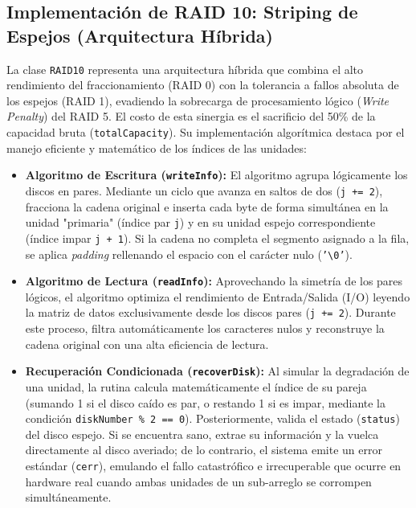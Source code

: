 \documentclass[12pt, a4paper]{article}
\begin{document}
\subsection{Implementación de RAID 10: Striping de Espejos (Arquitectura Híbrida)}

La clase \texttt{RAID10} representa una arquitectura híbrida que combina el alto rendimiento del fraccionamiento (RAID 0) con la tolerancia a fallos absoluta de los espejos (RAID 1), evadiendo la sobrecarga de procesamiento lógico (\textit{Write Penalty}) del RAID 5. El costo de esta sinergia es el sacrificio del 50\% de la capacidad bruta (\texttt{totalCapacity}). Su implementación algorítmica destaca por el manejo eficiente y matemático de los índices de las unidades:

\begin{itemize}
    \item \textbf{Algoritmo de Escritura (\texttt{writeInfo}):} El algoritmo agrupa lógicamente los discos en pares. Mediante un ciclo que avanza en saltos de dos (\texttt{j += 2}), fracciona la cadena original e inserta cada byte de forma simultánea en la unidad "primaria" (índice par \texttt{j}) y en su unidad espejo correspondiente (índice impar \texttt{j + 1}). Si la cadena no completa el segmento asignado a la fila, se aplica \textit{padding} rellenando el espacio con el carácter nulo (\texttt{'\textbackslash0'}).
    
    \item \textbf{Algoritmo de Lectura (\texttt{readInfo}):} Aprovechando la simetría de los pares lógicos, el algoritmo optimiza el rendimiento de Entrada/Salida (I/O) leyendo la matriz de datos exclusivamente desde los discos pares (\texttt{j += 2}). Durante este proceso, filtra automáticamente los caracteres nulos y reconstruye la cadena original con una alta eficiencia de lectura.
    
    \item \textbf{Recuperación Condicionada (\texttt{recoverDisk}):} Al simular la degradación de una unidad, la rutina calcula matemáticamente el índice de su pareja (sumando 1 si el disco caído es par, o restando 1 si es impar, mediante la condición \texttt{diskNumber \% 2 == 0}). Posteriormente, valida el estado (\texttt{status}) del disco espejo. Si se encuentra sano, extrae su información y la vuelca directamente al disco averiado; de lo contrario, el sistema emite un error estándar (\texttt{cerr}), emulando el fallo catastrófico e irrecuperable que ocurre en hardware real cuando ambas unidades de un sub-arreglo se corrompen simultáneamente.
\end{itemize}
\end{document}
